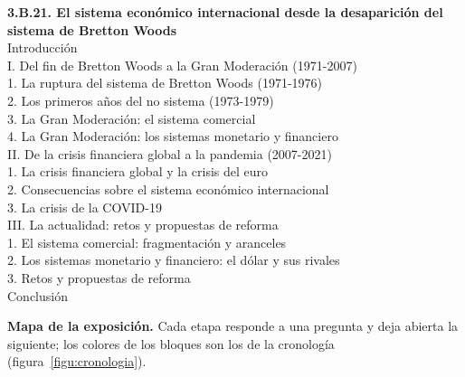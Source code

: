 \documentclass[11pt]{article}
\begin{document}
\begin{esquema}
\textbf{3.B.21. El sistema económico internacional desde la desaparición del sistema de Bretton Woods}\\[2pt]
Introducción\\
I. Del fin de Bretton Woods a la Gran Moderación (1971-2007)\\
\hspace*{1.5em}1. La ruptura del sistema de Bretton Woods (1971-1976)\\
\hspace*{1.5em}2. Los primeros años del no sistema (1973-1979)\\
\hspace*{1.5em}3. La Gran Moderación: el sistema comercial\\
\hspace*{1.5em}4. La Gran Moderación: los sistemas monetario y financiero\\
II. De la crisis financiera global a la pandemia (2007-2021)\\
\hspace*{1.5em}1. La crisis financiera global y la crisis del euro\\
\hspace*{1.5em}2. Consecuencias sobre el sistema económico internacional\\
\hspace*{1.5em}3. La crisis de la COVID-19\\
III. La actualidad: retos y propuestas de reforma\\
\hspace*{1.5em}1. El sistema comercial: fragmentación y aranceles\\
\hspace*{1.5em}2. Los sistemas monetario y financiero: el dólar y sus rivales\\
\hspace*{1.5em}3. Retos y propuestas de reforma\\
Conclusión
\end{esquema}

\begin{anotaciones}
\textbf{Mapa de la exposición.} Cada etapa responde a una pregunta y deja abierta la siguiente; los colores de los bloques son los de la cronología (figura~\ref{figu:cronologia}).
\begin{infografiacaja}
\caption{Mapa del tema: la pregunta de cada bloque y el hilo que los une}\label{figu:mapa-tema}
\end{infografiacaja}
\end{anotaciones}
\end{document}
